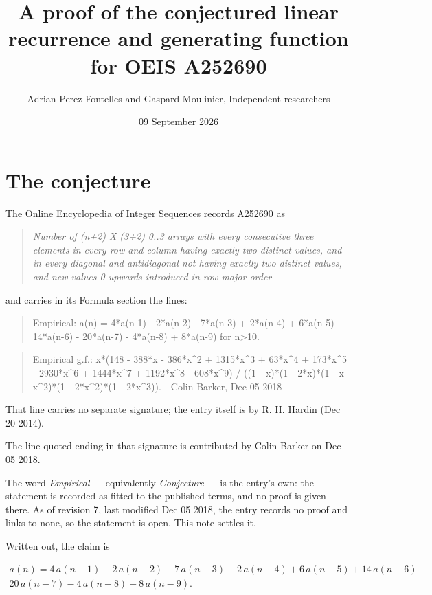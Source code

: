 \documentclass[11pt]{article}
\title{A proof of the conjectured linear recurrence and generating function for OEIS A252690}
\author{Adrian Perez Fontelles and Gaspard Moulinier, Independent researchers}
\date{09 September 2026}
\theoremstyle{definition}
\begin{document}
\maketitle
\section{The conjecture}

The Online Encyclopedia of Integer Sequences records \href{https://oeis.org/A252690}{A252690} as

\begin{quote}\itshape Number of (n+2) X (3+2) 0..3 arrays with every consecutive three elements in every row and column having exactly two distinct values, and in every diagonal and antidiagonal not having exactly two distinct values, and new values 0 upwards introduced in row major order\end{quote}

and carries in its Formula section the lines:

\begin{quote}\ttfamily Empirical: a(n) = 4*a(n-1) - 2*a(n-2) - 7*a(n-3) + 2*a(n-4) + 6*a(n-5) + 14*a(n-6) - 20*a(n-7) - 4*a(n-8) + 8*a(n-9) for n>10.\end{quote}

\begin{quote}\ttfamily Empirical g.f.: x*(148 - 388*x - 386*x\textasciicircum{}2 + 1315*x\textasciicircum{}3 + 63*x\textasciicircum{}4 + 173*x\textasciicircum{}5 - 2930*x\textasciicircum{}6 + 1444*x\textasciicircum{}7 + 1192*x\textasciicircum{}8 - 608*x\textasciicircum{}9) / ((1 - x)*(1 - 2*x)*(1 - x - x\textasciicircum{}2)*(1 - 2*x\textasciicircum{}2)*(1 - 2*x\textasciicircum{}3)). - Colin Barker, Dec 05 2018\end{quote}

That line carries no separate signature; the entry itself is by R. H. Hardin (Dec 20 2014).

The line quoted ending in that signature is contributed by Colin Barker on Dec 05 2018.

The word {\itshape Empirical} --- equivalently {\itshape Conjecture} --- is the entry's own: the statement is recorded as fitted to the published terms, and no proof is given there. As of revision 7, last modified Dec 05 2018, the entry records no proof and links to none, so the statement is open. This note settles it.

Written out, the claim is

\begin{multline*} a(n) = 4\,a(n-1) - 2\,a(n-2) - 7\,a(n-3) + 2\,a(n-4) + 6\,a(n-5) + 14\,a(n-6) - \\ 20\,a(n-7) - 4\,a(n-8) + 8\,a(n-9). \end{multline*}
\end{document}
